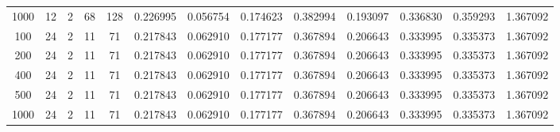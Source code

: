 \begin{table}[h]
\begin{tabular}{ccccccccccccc}
1000 & 12 & 2 & 68 & 128 & 0.226995 & 0.056754 & 0.174623 & 0.382994 & 0.193097 & 0.336830 & 0.359293 & 1.367092 \\
100 & 24 & 2 & 11 & 71 & 0.217843 & 0.062910 & 0.177177 & 0.367894 & 0.206643 & 0.333995 & 0.335373 & 1.367092 \\
200 & 24 & 2 & 11 & 71 & 0.217843 & 0.062910 & 0.177177 & 0.367894 & 0.206643 & 0.333995 & 0.335373 & 1.367092 \\
400 & 24 & 2 & 11 & 71 & 0.217843 & 0.062910 & 0.177177 & 0.367894 & 0.206643 & 0.333995 & 0.335373 & 1.367092 \\
500 & 24 & 2 & 11 & 71 & 0.217843 & 0.062910 & 0.177177 & 0.367894 & 0.206643 & 0.333995 & 0.335373 & 1.367092 \\
1000 & 24 & 2 & 11 & 71 & 0.217843 & 0.062910 & 0.177177 & 0.367894 & 0.206643 & 0.333995 & 0.335373 & 1.367092 \\
\bottomrule
\end{tabular}
\end{table}
